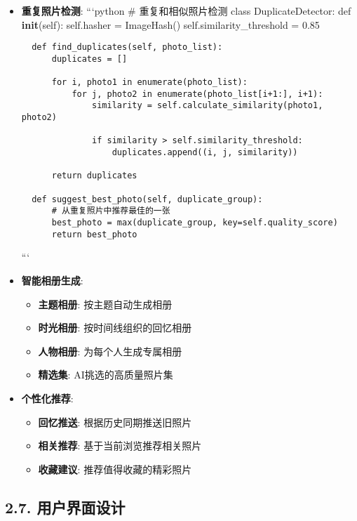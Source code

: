 \begin{itemize}
\item
  \textbf{重复照片检测}: ```python \# 重复和相似照片检测 class
  DuplicateDetector: def \textbf{init}(self): self.hasher = ImageHash()
  self.similarity\_threshold = 0.85

\begin{lstlisting}
  def find_duplicates(self, photo_list):
      duplicates = []

      for i, photo1 in enumerate(photo_list):
          for j, photo2 in enumerate(photo_list[i+1:], i+1):
              similarity = self.calculate_similarity(photo1, photo2)

              if similarity > self.similarity_threshold:
                  duplicates.append((i, j, similarity))

      return duplicates

  def suggest_best_photo(self, duplicate_group):
      # 从重复照片中推荐最佳的一张
      best_photo = max(duplicate_group, key=self.quality_score)
      return best_photo
\end{lstlisting}

  ```
\item
  \textbf{智能相册生成}:

  \begin{itemize}
  \tightlist
  \item
    \textbf{主题相册}: 按主题自动生成相册
  \item
    \textbf{时光相册}: 按时间线组织的回忆相册
  \item
    \textbf{人物相册}: 为每个人生成专属相册
  \item
    \textbf{精选集}: AI挑选的高质量照片集
  \end{itemize}
\item
  \textbf{个性化推荐}:

  \begin{itemize}
  \tightlist
  \item
    \textbf{回忆推送}: 根据历史同期推送旧照片
  \item
    \textbf{相关推荐}: 基于当前浏览推荐相关照片
  \item
    \textbf{收藏建议}: 推荐值得收藏的精彩照片
  \end{itemize}
\end{itemize}

\subsection{2.7.
用户界面设计}\label{ux7528ux6237ux754cux9762ux8bbeux8ba1}

